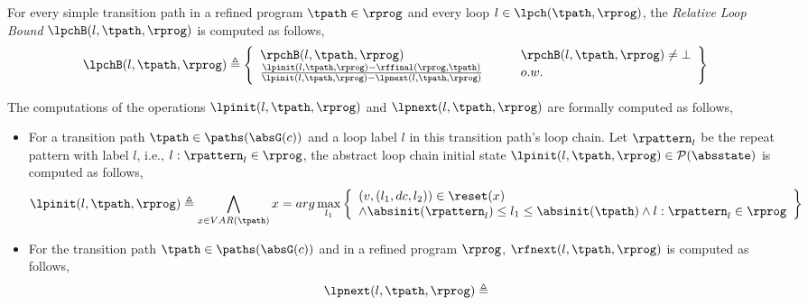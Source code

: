 \begin{enumerate}
\begin{enumerate}
\begin{defn}
  \label{def:relatedloop_bound}
For every simple transition path in a refined program $\tpath \in \rprog$
and every loop $l \in \lpch(\tpath, \rprog)$,
the \emph{Relative Loop Bound} $\lpchB(l, \tpath, \rprog)$ is computed as follows,
\[
  \lpchB(l, \tpath, \rprog) \triangleq
  \left\{
  \begin{array}{ll}
    \rpchB(l, \tpath, \rprog)  
    & \qquad \rpchB(l, \tpath, \rprog) \neq \bot
    \\
    \frac{\lpinit(l, \tpath, \rprog) - \rffinal(\rprog, \tpath)}{\lpinit(l, \tpath, \rprog) - \lpnext(l, \tpath, \rprog)}
    & \qquad o.w.
  \end{array}
  \right\}
  \]
\end{defn}
The computations of the operations $\lpinit(l, \tpath, \rprog)$ and $\lpnext(l, \tpath, \rprog)$
are formally computed as follows,
\begin{itemize}
\item For a transition path $\tpath \in \paths(\absG(c))$ and a loop label $l$ in this transition path's loop chain.
Let $\rpattern_l$ be the repeat pattern with label $l$, i.e., $l: \rpattern_l \in \rprog$, 
the abstract loop chain initial state $\lpinit(l, \tpath, \rprog) \in \mathcal{P}(\absstate)$ is computed as follows,
\[
  \lpinit(l, \tpath, \rprog) \triangleq 
  \bigwedge_{x \in VAR(\tpath)}
  x = arg\max_{l_1}
  \left\{
      \begin{array}{l}
    (v, (l_1, dc, l_2)) \in \reset(x) 
        \\ 
    \land \absinit(\rpattern_l) \leq l_1 \leq \absinit(\tpath)
    \land l: \rpattern_l \in \rprog
    \end{array}
    \right\}
  \]
\item
For the transition path $\tpath \in \paths(\absG(c))$ and in a refined program $\rprog$,
$\rfnext(l, \tpath, \rprog)$ is computed as follows,
%
\[
  \begin{array}{l}
  \lpnext(l, \tpath, \rprog) \triangleq 

\end{array}\]
\end{itemize}
\end{enumerate}
\end{enumerate}
